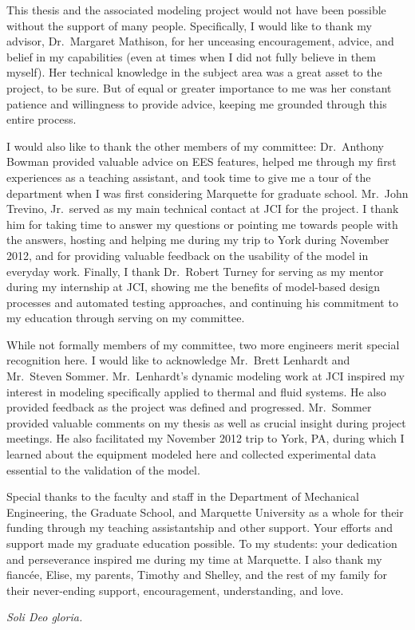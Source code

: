 \begin{acknowledgments}
  This thesis and the associated modeling project 
  would not have been possible without the support of many people. 
  Specifically, I would like to thank my advisor, Dr.~Margaret Mathison,
  for her unceasing encouragement, advice, and belief in my capabilities 
  (even at times when I did not fully believe in them myself). 
  Her technical knowledge in the subject area was a 
  great asset to the project, to be sure.
  But of equal or greater importance to me was 
  her constant patience and willingness to provide advice, 
  keeping me grounded through this entire process.
  
  I would also like to thank the other members of my committee:
  Dr.~Anthony Bowman provided valuable advice on EES features,
  helped me through my first experiences as a teaching assistant, 
  and took time to give me a tour of the department when I was 
  first considering Marquette for graduate school.
  Mr.~John Trevino, Jr.~served as my main technical contact at JCI
  for the project. I thank him for taking time to answer my questions
  or pointing me towards people with the answers, hosting and helping
  me during my trip to York during November 2012, and for providing
  valuable feedback on the usability of the model in everyday work.
  Finally, I thank Dr.~Robert Turney for serving as my mentor
  during my internship at JCI, showing me the benefits of model-based
  design processes and automated testing approaches, and continuing
  his commitment to my education through serving on my committee.
  
  While not formally members of my committee, two more 
  engineers merit special recognition here. 
  I would like to acknowledge Mr.~Brett Lenhardt and Mr.~Steven Sommer.
  Mr.~Lenhardt's dynamic modeling work at JCI inspired my interest
  in modeling specifically applied to thermal and fluid systems.
  He also provided feedback as the project was defined and progressed.
  Mr.~Sommer provided valuable comments on my thesis as well as crucial
  insight during project meetings. He also facilitated my November 2012 trip
  to York, PA, during which I learned about the equipment modeled here
  and collected experimental data essential to the validation of the model.

  Special thanks to the faculty and staff in the Department of 
  Mechanical Engineering, the Graduate School, and Marquette University 
  as a whole for their funding through my teaching assistantship and other support.
  Your efforts and support made my graduate education possible.
  To my students: your dedication and perseverance 
  inspired me during my time at Marquette. 
  I also thank my fianc\'ee, Elise, 
  my parents, Timothy and Shelley, and the rest of my family for their 
  never-ending support, encouragement, understanding, and love.

  \vfill \centering
    \emph{Soli Deo gloria.}
  \vfill
\end{acknowledgments}
